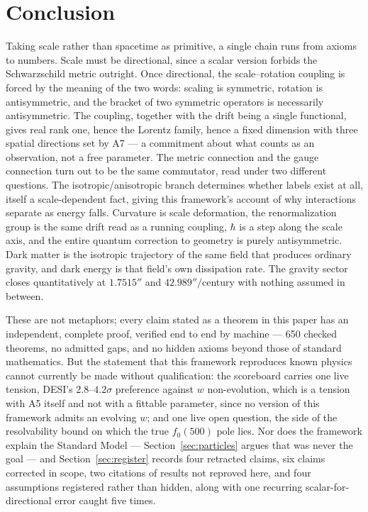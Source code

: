\documentclass[pdflatex,sn-mathphys-num]{sn-jnl}
\theoremstyle{thmstyleone}
\theoremstyle{thmstylethree}
\theoremstyle{thmstyletwo}
\begin{document}
\section{Conclusion}\label{sec:concl}

Taking scale rather than spacetime as primitive, a single chain runs from
axioms to numbers. Scale must be directional, since a scalar version
forbids the Schwarzschild metric outright. Once directional, the
scale–rotation coupling is forced by the meaning of the two words:
scaling is symmetric, rotation is antisymmetric, and the bracket of two
symmetric operators is necessarily antisymmetric. The coupling, together
with the drift being a single functional, gives real rank one, hence the
Lorentz family, hence a fixed dimension with three spatial directions set
by A7 — a commitment about what counts as an observation, not a free
parameter. The metric connection and the gauge connection turn out to be
the same commutator, read under two different questions. The
isotropic/anisotropic branch determines whether labels exist at all,
itself a scale-dependent fact, giving this framework's account of why
interactions separate as energy falls. Curvature is scale deformation,
the renormalization group is the same drift read as a running coupling,
$\hbar$ is a step along the scale axis, and the entire quantum correction
to geometry is purely antisymmetric. Dark matter is the isotropic
trajectory of the same field that produces ordinary gravity, and dark
energy is that field's own dissipation rate. The gravity sector closes
quantitatively at $1.7515''$ and $42.989''/$century with nothing assumed
in between.

These are not metaphors; every claim stated as a theorem in this paper
has an independent, complete proof, verified end to end by machine — 650
checked theorems, no admitted gaps, and no hidden axioms beyond those of
standard mathematics. But the statement that this framework reproduces
known physics cannot currently be made without qualification: the
scoreboard carries one live tension, DESI's $2.8$–$4.2\sigma$ preference
against $w$ non-evolution, which is a tension with A5 itself and not with
a fittable parameter, since no version of this framework admits an
evolving $w$; and one live open question, the side of the resolvability
bound on which the true $f_0(500)$ pole lies. Nor does the framework
explain the Standard Model — Section~\ref{sec:particles} argues that was
never the goal — and Section~\ref{sec:register} records four retracted
claims, six claims corrected in scope, two citations of results not
reproved here, and four assumptions registered rather than hidden, along
with one recurring scalar-for-directional error caught five times.
\end{document}
